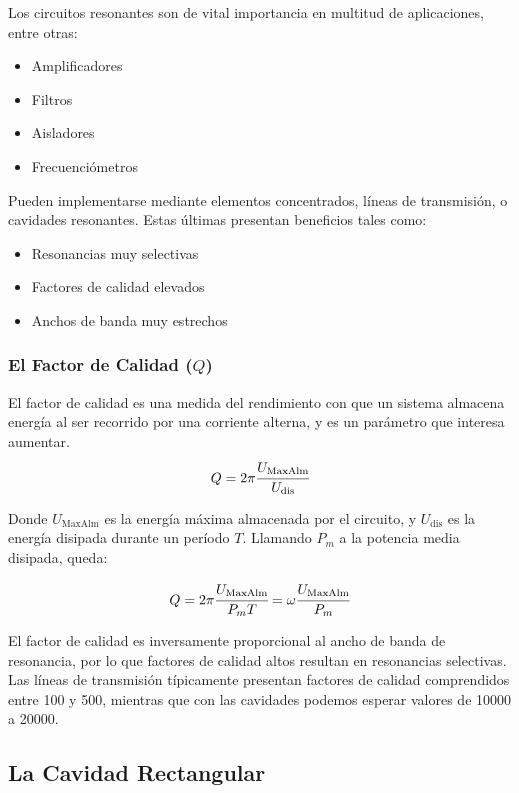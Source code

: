 \documentclass[12pt]{article}
\begin{document}
Los circuitos resonantes son de vital importancia en multitud de aplicaciones, entre otras:
\begin{itemize}
	\item Amplificadores
	\item Filtros
	\item Aisladores
	\item Frecuenci\'ometros
\end{itemize}

Pueden implementarse mediante elementos concentrados, l\'ineas de transmisi\'on, o cavidades resonantes. Estas \'ultimas presentan beneficios tales como:
\begin{itemize}
	\item Resonancias muy selectivas
	\item Factores de calidad elevados
	\item Anchos de banda muy estrechos
\end{itemize}

\subsubsection{El Factor de Calidad ($Q$)}

El factor de calidad es una medida del rendimiento con que un sistema almacena energ\'ia al ser recorrido por una corriente alterna, y es un par\'ametro que interesa aumentar.
$$Q=2\pi\cfrac{U_{\text{MaxAlm}}}{U_{\text{dis}}}$$

Donde $U_{\text{MaxAlm}}$ es la energ\'ia m\'axima almacenada por el circuito, y $U_{\text{dis}}$ es la energ\'ia disipada durante un per\'iodo $T$. Llamando $P_m$ a la potencia media disipada, queda:

$$Q=2\pi\cfrac{U_{\text{MaxAlm}}}{P_m T} = \omega\cfrac{U_{\text{MaxAlm}}}{P_m}$$

El factor de calidad es inversamente proporcional al ancho de banda de resonancia, por lo que factores de calidad altos resultan en resonancias selectivas. Las l\'ineas de transmisi\'on t\'ipicamente presentan factores de calidad comprendidos entre 100 y 500, mientras que con las cavidades podemos esperar valores de 10000 a 20000.

\subsection{La Cavidad Rectangular}
\end{document}
